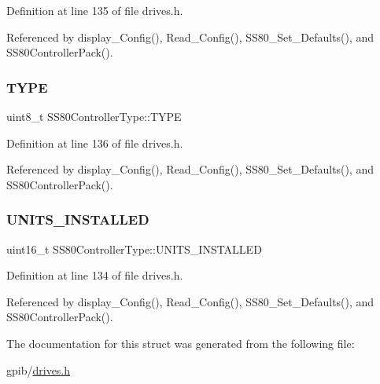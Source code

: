 Definition at line 135 of file drives.\+h.



Referenced by display\+\_\+\+Config(), Read\+\_\+\+Config(), S\+S80\+\_\+\+Set\+\_\+\+Defaults(), and S\+S80\+Controller\+Pack().

\mbox{\label{structSS80ControllerType_a255739680bca0ad3b4d1346cf5017332}} 
\subsubsection{\texorpdfstring{T\+Y\+PE}{TYPE}}
{\footnotesize\ttfamily uint8\+\_\+t S\+S80\+Controller\+Type\+::\+T\+Y\+PE}



Definition at line 136 of file drives.\+h.



Referenced by display\+\_\+\+Config(), Read\+\_\+\+Config(), S\+S80\+\_\+\+Set\+\_\+\+Defaults(), and S\+S80\+Controller\+Pack().

\mbox{\label{structSS80ControllerType_a0868c32b362ef2af2ac64fa16aee8aae}} 
\subsubsection{\texorpdfstring{U\+N\+I\+T\+S\+\_\+\+I\+N\+S\+T\+A\+L\+L\+ED}{UNITS\_INSTALLED}}
{\footnotesize\ttfamily uint16\+\_\+t S\+S80\+Controller\+Type\+::\+U\+N\+I\+T\+S\+\_\+\+I\+N\+S\+T\+A\+L\+L\+ED}



Definition at line 134 of file drives.\+h.



Referenced by display\+\_\+\+Config(), Read\+\_\+\+Config(), S\+S80\+\_\+\+Set\+\_\+\+Defaults(), and S\+S80\+Controller\+Pack().



The documentation for this struct was generated from the following file\+:\begin{DoxyCompactItemize}
\item 
gpib/\hyperlink{drives_8h}{drives.\+h}\end{DoxyCompactItemize}
